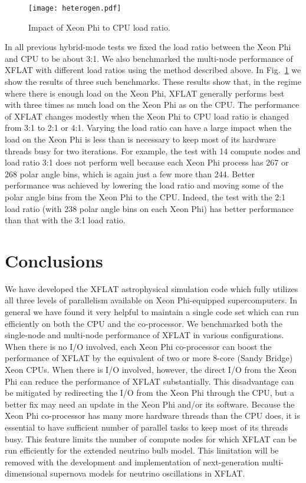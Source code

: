 \documentclass{sig-alternate}
\begin{document}
\begin{figure}[t]
\centering
\texttt{[image: heterogen.pdf]}
\caption{Impact of Xeon Phi to CPU load ratio.}
\label{fig:het}
\end{figure}

In all previous hybrid-mode tests we fixed the load ratio between the
Xeon Phi and CPU to be about 3:1. We also benchmarked the multi-node performance
of XFLAT  with different load ratios using the
method described above. In Fig.~\ref{fig:het} we show the results of
three such benchmarks. These results show that, in the regime where
there is enough load on the Xeon Phi, XFLAT generally performs best with three times
as much load on the Xeon Phi as on the CPU. The performance of XFLAT changes
modestly when the Xeon Phi to CPU load ratio is changed from 3:1 to 2:1 or
4:1. Varying the load ratio can have a large impact when the load on
the Xeon Phi is less than is necessary to keep most of its hardware
threads busy for two iterations.  
For example, the test with 14 compute nodes and load ratio 3:1 does not
perform well because each Xeon Phi process has 267 or 268 polar angle
bins, which is again just a few more than 244. Better performance was
achieved by lowering the load ratio and
moving some of the polar angle bins from the Xeon Phi to the
CPU. Indeed, the test
with the 2:1 load ratio (with 238 polar angle bins on each Xeon Phi)
has better performance than that with the 3:1 load ratio. 


\section{Conclusions}
We have developed the XFLAT astrophysical simulation
code which fully utilizes all three levels of parallelism available on
Xeon Phi-equipped supercomputers. In general we have found it very helpful
to maintain a single code set which can run efficiently on both the CPU and the
co-processor. 
We benchmarked both the single-node and
multi-node performance of XFLAT in various configurations. 
When there is no I/O involved, each Xeon Phi co-processor can boost
the performance of XFLAT by the equivalent of two or more
8-core (Sandy Bridge) Xeon CPUs.
When there is I/O involved, however, the direct I/O from the Xeon Phi can
reduce the performance of XFLAT substantially. This disadvantage can
be mitigated by redirecting the I/O from the Xeon Phi through the CPU, but a
better fix may need an update in the Xeon Phi and/or its software.
Because the Xeon Phi co-processor has many more hardware threads than the CPU
does, it is essential to have sufficient number of parallel tasks to keep most
of its threads busy. This feature limits the number of compute nodes
for which XFLAT can be run efficiently for the extended neutrino bulb
model. This limitation will be removed with the development and implementation of next-generation multi-dimensional supernova models for neutrino oscillations in XFLAT. 
\end{document}
